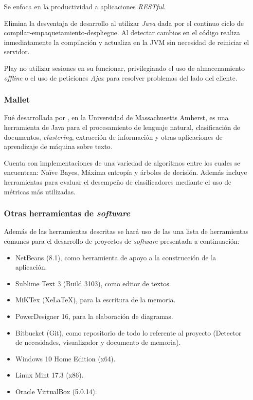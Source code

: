 Se enfoca en la productividad a aplicaciones \textit{RESTful}.

Elimina la desventaja de desarrollo al utilizar \textit{Java} dada por el continuo ciclo de compilar-empaquetamiento-despliegue. Al detectar cambios en el código realiza inmediatamente la compilación y actualiza en la JVM sin necesidad de reiniciar el servidor.

Play no utilizar sesiones en su funcionar, privilegiando el uso de almacenamiento \textit{offline} o el uso de peticiones \textit{Ajax} para resolver problemas del lado del cliente.

\subsubsection{Mallet}
\label{subsubsec:mallet}

Fué desarrollada por \cite{Mallet}, en la Universidad de Massachusetts Amherst, es una herramienta de Java para el procesamiento de lenguaje natural, clasificación de documentos, \textit{clustering}, extracción de información y otras aplicaciones de aprendizaje de máquina sobre texto.

Cuenta con implementaciones de una variedad de algoritmos entre los cuales se encuentran: Naïve Bayes, Máxima entropía y árboles de decisión. Además incluye herramientas para evaluar el desempeño de clasificadores mediante el uso de métricas más utilizadas.

\subsubsection{Otras herramientas de \textit{software}}
\label{subsubsec:herrSoft}

Además de las herramientas descritas se hará uso de las una lista de herramientas comunes para el desarrollo de proyectos de \textit{software} presentada a continuación:

\begin{itemize}
\item NetBeans (8.1), como herramienta de apoyo a la construcción de la aplicación.
\item Sublime Text 3 (Build 3103), como editor de textos.
\item MiKTex (XeLaTeX), para la escritura de la memoria.
\item PowerDesigner 16, para la elaboración de diagramas.
\item Bitbucket (Git), como repositorio de todo lo referente al proyecto (Detector de necesidades, visualizador y documento de memoria).
\item Windows 10 Home Edition (x64).
\item Linux Mint 17.3 (x86).
\item Oracle VirtualBox (5.0.14).
\end{itemize}

